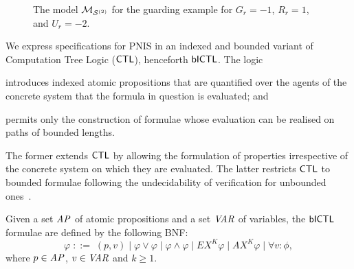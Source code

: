 \begin{example}
\begin{figure}

    \vspace{-0.3cm}
    
    \label{fig:model-guarding}
    \caption{The model $\mathcal{M}_{\mathcal{S}^{(2)}}$ for the guarding example for $G_r=-1$, $R_r=1$,
      and $U_r=-2$.}
  \end{figure}
\end{example}


We express specifications for PNIS in an indexed and bounded variant of
Computation Tree Logic ($\sf{CTL}$), henceforth $\sf{bICTL}$. The logic
\begin{inparaenum}[\it (i)]
\item introduces indexed atomic propositions that are quantified over the
  agents of the concrete system that the formula in question is evaluated; and
\item permits only the construction of formulae whose evaluation can be
  realised on paths of bounded lengths.
\end{inparaenum}
The former extends $\sf{CTL}$ by allowing the formulation of properties
irrespective of the concrete system on which they are evaluated.  The latter
restricts $\sf{CTL}$ to bounded formulae following the undecidability of
verification for unbounded ones~\cite{Akintunde+20}.

\begin{definition}
Given a  set $\it{AP}$ of atomic propositions and a set $\it{VAR}$ of variables,
the $\sf{bICTL}$  formulae are defined by the following BNF:
\[
  \varphi \;   ::= \; (p, v) \mid \varphi \lor \varphi \mid \varphi \land \varphi
  \mid EX^K \varphi \mid AX^K \varphi \mid \forall v \colon \phi,
\]
where  $p \in \it{AP}$, $v \in \it{VAR}$ and $k \geq  1$.
\end{definition}

